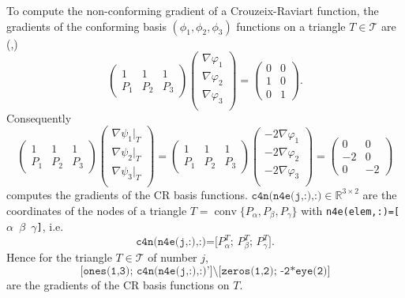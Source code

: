 To compute the non-conforming gradient of a Crouzeix-Raviart function, the
gradients of the conforming basis $(\phi_1,\phi_2,\phi_3)$ functions on a triangle $T\in\mathcal T$
are (\cite{Carstensen2017script},\cite{CarstensenBrennerFEM})
\begin{equation*}
  \begin{pmatrix}
    1 & 1 & 1\\
    P_1 & P_2 & P_3
  \end{pmatrix}
  \begin{pmatrix}
    \nabla \varphi_1\\
    \nabla \varphi_2\\
    \nabla \varphi_3\\
  \end{pmatrix}
  =
  \begin{pmatrix}
    0 & 0 \\
    1 & 0\\
    0&1
  \end{pmatrix}.
\end{equation*}
Consequently
\begin{equation*}
  \begin{pmatrix}
    1 & 1 & 1\\
    P_1 & P_2 & P_3
  \end{pmatrix}
  \begin{pmatrix}
    \nabla \psi_1|_T\\
    \nabla \psi_2|_T\\
    \nabla \psi_3|_T\\
  \end{pmatrix}
  =
  \begin{pmatrix}
    1 & 1 & 1\\
    P_1 & P_2 & P_3
  \end{pmatrix}
  \begin{pmatrix}
   -2 \nabla \varphi_1\\
   -2 \nabla \varphi_2\\
   -2 \nabla \varphi_3\\
  \end{pmatrix}
  =
  \begin{pmatrix}
    0 & 0 \\
    -2 & 0\\
    0&-2
  \end{pmatrix}
\end{equation*}
computes the gradients of the CR basis functions. 
$\texttt{c4n(n4e(j,:),:)}\in\mathbb R^{3\times 2}$ 
are the coordinates of the nodes of a triangle
$T=\operatorname{conv}\{P_\alpha,P_\beta,P_\gamma\}$ with 
\texttt{n4e(elem,:)=[$\alpha$ $\beta$ $\gamma$]}, i.e. 
\[
\texttt{c4n(n4e(j,:),:)=[$P_\alpha^T$; $P_\beta^T$; $P_\gamma^T$]}.
\]
Hence for the triangle $T\in\mathcal T$ of number $j$,
\[
\texttt{[ones(1,3); c4n(n4e(j,:),:)']\textbackslash[zeros(1,2); -2*eye(2)]}
\]
are the gradients of the CR basis functions on $T$.

